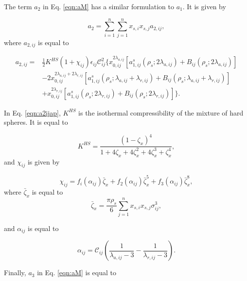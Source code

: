 The term $a_{2}$ in Eq. \ref{eqn:aM} has a similar formulation to $a_{1}$. It is given by

\begin{equation}
a_{2} = \sum_{i=1}^{n} \sum_{j=1}^{n} x_{s,i} x_{s,j} a_{2,ij},
\end{equation}	
where $a_{2,ij}$ is equal to

\begin{equation}
\begin{aligned}
a_{2,ij} {}=&  \frac{1}{2} K^{HS} (1+ \chi_{ij}) \epsilon_{ij} \mathcal{C}_{ij}^2 \lbrace x_{0,ij}^{2\lambda _{a,ij}} [a_{1,ij}^{s}(\rho _{s}; 2\lambda _{a,ij}) + B_{ij}(\rho _{s}; 2\lambda _{a,ij})] \\
& - 2x_{0,ij}^{2\lambda _{a,ij} + 2\lambda _{r,ij}} [a_{1,ij}^{s}(\rho _{s}; \lambda _{a,ij} + \lambda _{r,ij}) + B_{ij}(\rho _{s}; \lambda _{a,ij} + \lambda _{r,ij})] \\
& +  x_{0,ij}^{2\lambda _{r,ij}} [a_{1,ij}^{s}(\rho _{s}; 2\lambda _{r,ij}) + B_{ij}(\rho _{s}; 2\lambda _{r,ij})] \rbrace.
\end{aligned}
\label{eqn:a2ijap}
\end{equation}

In Eq. \ref{eqn:a2ijap}, $K^{HS}$ is the isothermal compressibility of the mixture of hard spheres. It is equal to

\begin{equation}
K^{HS} = \dfrac{(1-\zeta_{x})^{4}}{1+4 \zeta_{x}+4 \zeta_{x}^{2}+4 \zeta_{x}^{3}+\zeta_{x}^{4}},
\end{equation}
and $\chi_{ij}$ is given by

\begin{equation}
\chi_{ij} = f_{i}(\alpha_{ij}) \bar{\zeta}_{x} + f_{2}(\alpha_{ij}) \bar{\zeta}_{x}^{5} + f_{3}(\alpha_{ij}) \bar{\zeta}_{x}^{8},
\end{equation}
where $\bar{\zeta}_{x}$ is equal to
\begin{equation}
\bar{\zeta}_{x} = \frac{\pi \rho _{s}}{6} \sum_{j=1}^{n} x_{s,i} x_{s,j} \sigma_{ij}^{3},
\end{equation}

and $\alpha_{ij}$ is equal to

\begin{equation}
\alpha_{ij} = \mathcal{C}_{ij} \left(\frac{1}{\lambda_{a,ij}-3} - \frac{1}{\lambda_{r,ij}-3} \right).
\end{equation}

Finally, $a_{3}$  in Eq. \ref{eqn:aM} is equal to

